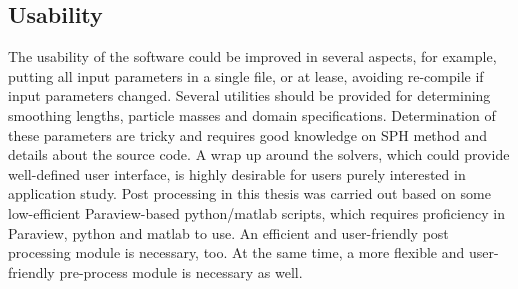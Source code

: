 \subsection{Usability}
The usability of the software could be improved in several aspects, for example, putting all input parameters in a single file, or at lease, avoiding re-compile if input parameters changed. Several utilities should be provided for determining smoothing lengths, particle masses and domain specifications. Determination of these parameters are tricky and requires good knowledge on SPH method and details about the source code.
A wrap up around the solvers, which could provide well-defined user interface, is highly desirable for users purely interested in application study. Post processing in this thesis was carried out based on some low-efficient Paraview-based python/matlab scripts, which requires proficiency in Paraview, python and matlab to use. An efficient and user-friendly post processing module is necessary, too. At the same time, a more flexible and user-friendly pre-process module is necessary as well. 

